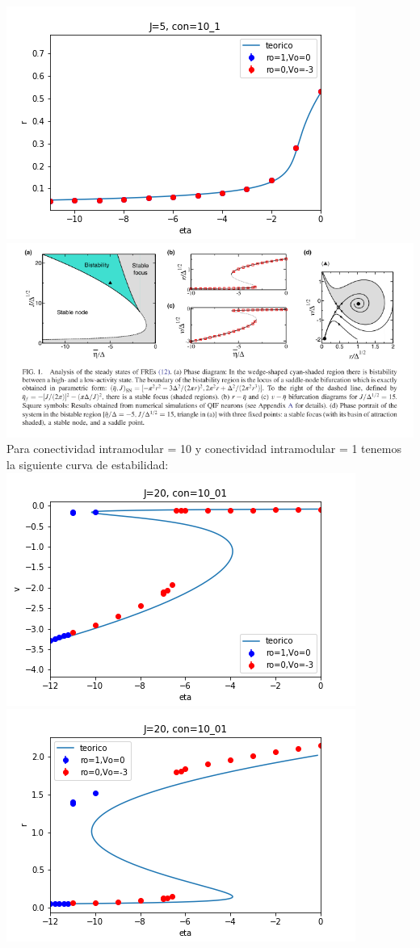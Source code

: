 \documentclass[a4paper]{article}
\begin{document}
\includegraphics[scale=0.7]{r_vs_eta_J5_mod10_1.png}\\
\includegraphics[scale=0.4]{diagramaspaper.png}\\
Para conectividad intramodular = 10 y conectividad intramodular = 1 tenemos la siguiente curva de estabilidad:\\
\includegraphics[scale=0.7]{v_vs_eta_J20_mod10_01.png}\\
\includegraphics[scale=0.7]{r_vs_eta_J20_mod10_01.png}\\
\end{document}
